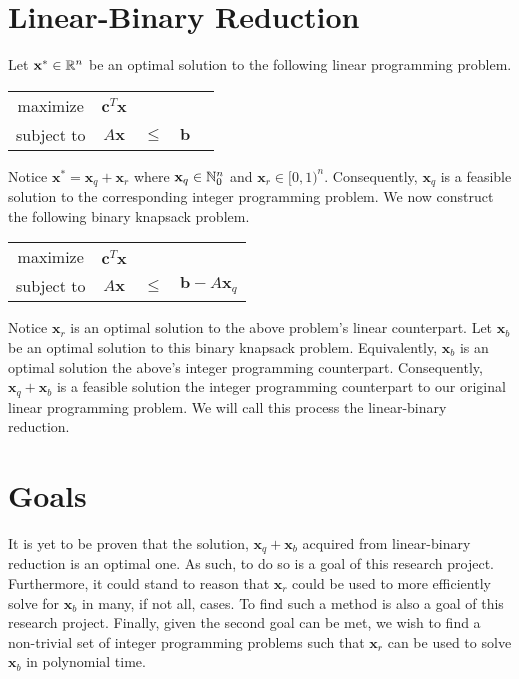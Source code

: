 \documentclass[conference]{IEEEtran}
\numberwithin{equation}{section}
\numberwithin{figure}{section}
\theoremstyle{plain}
\theoremstyle{definition}
\newcommand{\R}{\ensuremath \mathbb{R}}
\newcommand{\N}{\ensuremath \mathbb{N}}
\begin{document}
\section{Linear-Binary Reduction}
Let $\mathbf{x}^* \in \R^n$ be an optimal solution to the following linear  
programming problem. \\
\begin{center}\begin{tabular}{ccccc}
  maximize   & $\mathbf{c}^T\mathbf{x}$ &        &              \\
  subject to & $A\mathbf{x}$            & $\leq$ & $\mathbf{b}$ \\
\end{tabular}\end{center}
Notice $\mathbf{x}^* = \mathbf{x}_q + \mathbf{x}_r$ where $\mathbf{x}_q \in 
\N_0^n$ and $\mathbf{x}_r \in [0,1)^n$. Consequently, $\mathbf{x}_q$ is a 
feasible solution to the corresponding integer programming problem. We now 
construct the following binary knapsack problem. \\
\begin{center}\begin{tabular}{cccc}
  maximize   & $\mathbf{c}^T\mathbf{x}$ &        & \\
  subject to & $A\mathbf{x}$            & $\leq$ & $\mathbf{b} - A\mathbf{x}_q$ \\
\end{tabular}\end{center}
Notice $\mathbf{x}_r$ is an optimal solution to the above problem's linear 
counterpart. Let $\mathbf{x}_b$ be an optimal solution to this binary knapsack 
problem. Equivalently, $\mathbf{x}_b$ is an optimal solution the above's integer 
programming counterpart. Consequently, $\mathbf{x}_q + \mathbf{x}_b$ is a 
feasible solution the integer programming counterpart to our original linear 
programming problem. We will call this process the linear-binary reduction. \\

\section{Goals}
It is yet to be proven that the solution, $\mathbf{x}_q + \mathbf{x}_b$ acquired 
from linear-binary reduction is an optimal one. As such, to do so is a goal of 
this research project. Furthermore, it could stand to reason that $\mathbf{x}_r$ 
could be used to more efficiently solve for $\mathbf{x}_b$ in many, if not all, 
cases. To find such a method is also a goal of this research project. Finally, 
given the second goal can be met, we wish to find a non-trivial set of integer 
programming problems such that $\mathbf{x}_r$ can be used to solve $\mathbf{x}_b$ 
in polynomial time. \\
\end{document}

